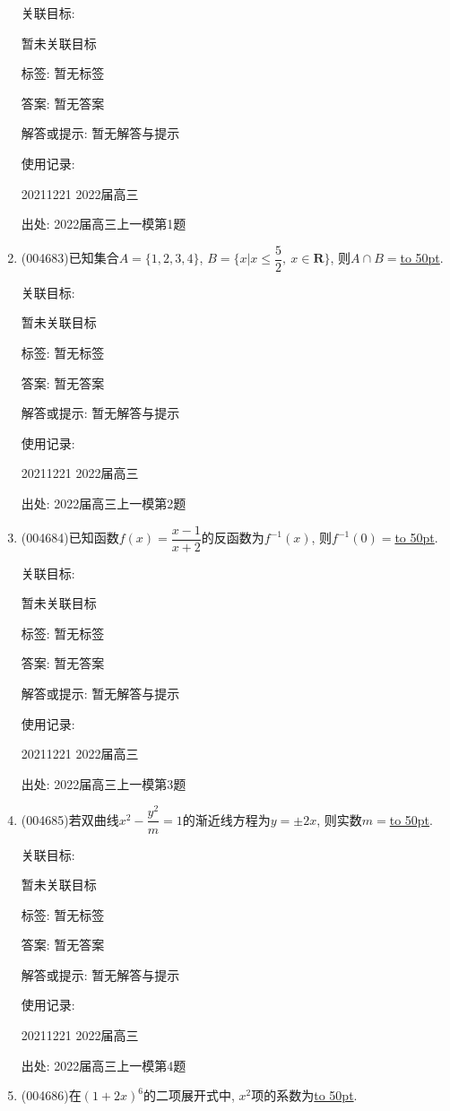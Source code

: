 \documentclass[10pt,a4paper]{article}
\newcommand{\blank}[1]{\underline{\hbox to #1pt{}}}
\begin{document}
\begin{enumerate}[1.]
关联目标:

暂未关联目标



标签: 暂无标签

答案: 暂无答案

解答或提示: 暂无解答与提示

使用记录:

20211221	2022届高三	


出处: 2022届高三上一模第1题
\item { (004683)}已知集合$A=\{1,2,3,4\}$, $B=\{x|x\le \dfrac 52, \ x\in \mathbf{R}\}$, 则$A\cap B=$\blank{50}.


关联目标:

暂未关联目标



标签: 暂无标签

答案: 暂无答案

解答或提示: 暂无解答与提示

使用记录:

20211221	2022届高三	


出处: 2022届高三上一模第2题
\item { (004684)}已知函数$f(x)=\dfrac{x-1}{x+2}$的反函数为$f^{-1}(x)$, 则$f^{-1}(0)=$\blank{50}.


关联目标:

暂未关联目标



标签: 暂无标签

答案: 暂无答案

解答或提示: 暂无解答与提示

使用记录:

20211221	2022届高三	


出处: 2022届高三上一模第3题
\item { (004685)}若双曲线$x^2-\dfrac{y^2}m=1$的渐近线方程为$y=\pm 2x$, 则实数$m=$\blank{50}.


关联目标:

暂未关联目标



标签: 暂无标签

答案: 暂无答案

解答或提示: 暂无解答与提示

使用记录:

20211221	2022届高三	


出处: 2022届高三上一模第4题
\item { (004686)}在$(1+2x)^6$的二项展开式中, $x^2$项的系数为\blank{50}.



\end{enumerate}
\end{document}
